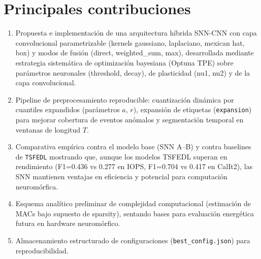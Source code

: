 \section{Principales contribuciones}
\begin{enumerate}
    \item Propuesta e implementación de una arquitectura híbrida SNN-CNN con capa convolucional parametrizable (kernels gaussiano, laplaciano, mexican hat, box) y modos de fusión (direct, weighted\_sum, max), desarrollada mediante estrategia sistemática de optimización bayesiana (Optuna TPE) sobre parámetros neuronales (threshold, decay), de plasticidad (nu1, nu2) y de la capa convolucional.
    \item Pipeline de preprocesamiento reproducible: cuantización dinámica por cuantiles expandidos (parámetros \(a\), \(r\)), expansión de etiquetas (\texttt{expansion}) para mejorar cobertura de eventos anómalos y segmentación temporal en ventanas de longitud \(T\).
    \item Comparativa empírica contra el modelo base (SNN A--B) y contra baselines de \texttt{TSFEDL} mostrando que, aunque los modelos TSFEDL superan en rendimiento (F1=0.436 vs 0.277 en IOPS, F1=0.704 vs 0.417 en CalIt2), las SNN mantienen ventajas en eficiencia y potencial para computación neuromórfica.
    \item Esquema analítico preliminar de complejidad computacional (estimación de MACs bajo supuesto de sparsity), sentando bases para evaluación energética futura en hardware neuromórfico.
    \item Almacenamiento estructurado de configuraciones (\texttt{best\_config.json}) para reproducibilidad.
\end{enumerate}

